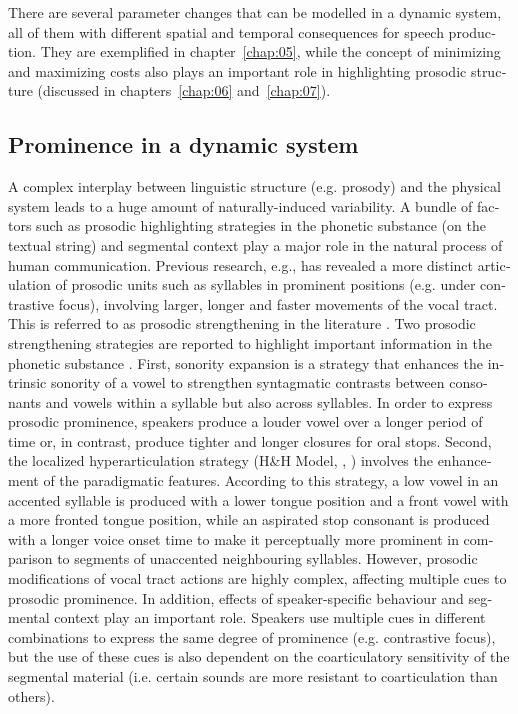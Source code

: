 \begin{otherlanguage}{english}
There are several parameter changes that can be modelled in a dynamic system, all of them with different spatial and temporal consequences for speech production. They are exemplified in chapter~\ref{chap:05}, while the concept of minimizing and maximizing costs also plays an important role in highlighting prosodic structure (discussed in chapters~\ref{chap:06} and~\ref{chap:07}).

\subsection{Prominence in a dynamic system}
\label{subsec:0803}

A complex interplay between linguistic structure (e.g. prosody) and the physical system leads to a huge amount of naturally-induced variability. A bundle of factors such as prosodic highlighting strategies in the phonetic substance (on the textual string) and segmental context play a major role in the natural process of human communication. Previous research, e.g., has revealed a more distinct articulation of prosodic units such as syllables in prominent positions (e.g. under contrastive focus), involving larger, longer and faster movements of the vocal tract. This is referred to as prosodic strengthening in the literature \citep{Cho2006}. Two prosodic strengthening strategies are reported to highlight important information in the phonetic substance \citep{Mücke2014b}. First, sonority expansion is a strategy \citep{Harrington2000} that enhances the intrinsic sonority of a vowel to strengthen syntagmatic contrasts between consonants and vowels within a syllable but also across syllables. In order to express prosodic prominence, speakers produce a louder vowel over a longer period of time or, in contrast, produce tighter and longer closures for oral stops. Second, the localized hyperarticulation strategy (H\&H Model, \citealt{Lindblom1990}, \citealt{DeJong2004}) involves the enhancement of the paradigmatic features. According to this strategy, a low vowel in an accented syllable is produced with a lower tongue position and a front vowel with a more fronted tongue position, while an aspirated stop consonant is produced with a longer voice onset time to make it perceptually more prominent in comparison to segments of unaccented neighbouring syllables. However, prosodic modifications of vocal tract actions are highly complex, affecting multiple cues to prosodic prominence. In addition, effects of speaker-specific behaviour and segmental context play an important role. Speakers use multiple cues in different combinations to express the same degree of prominence (e.g. contrastive focus), but the use of these cues is also dependent on the coarticulatory sensitivity of the segmental material (i.e. certain sounds are more resistant to coarticulation than others). 




\end{otherlanguage}
